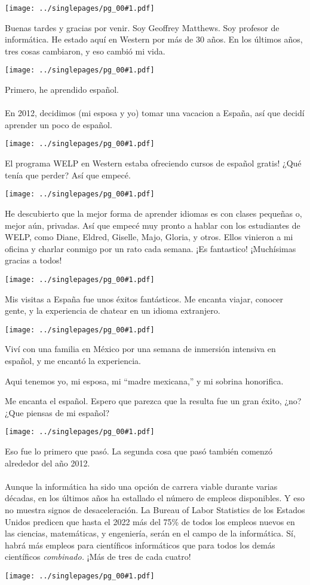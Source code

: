 \documentclass[12pt]{article}
\newcommand{\cue}{\mbox{}\\
  \fbox{\sf Next slide}
\\}
\newcommand{\fig}[1]{
  \newpage  
  \begin{center}
    \texttt{[image: ../singlepages/pg\_00\#1.pdf]}
  \end{center}
  
}
\begin{document}
\Large


\fig{01}
Buenas tardes y gracias por venir.  Soy Geoffrey Matthews. Soy
profesor de informática. He estado aquí en Western por más de 30 años.
En los últimos años, tres cosas cambiaron, y eso cambió mi vida.

\fig{03}

Primero, he aprendido español.  \cue En 2012, decidimos (mi esposa y
yo) tomar una vacacion a España, así que decidí aprender un poco de
español.

\fig{04}

El programa WELP en Western estaba ofreciendo cursos de
español gratis!  ¿Qué tenía que perder?  Así que empecé.

\fig{05}

He descubierto que la mejor forma de aprender idiomas es con clases
pequeñas o, mejor aún, privadas.  Así que empecé muy pronto a hablar
con los estudiantes de WELP, como Diane, Eldred, Giselle, Majo,
Gloria, y otros.  Ellos vinieron a mi oficina y charlar conmigo por un
rato cada semana.  ¡Es fantastico! ¡Muchísimas gracias a todos!

\fig{06}

Mis visitas a España fue unos éxitos fantásticos.  Me encanta viajar,
conocer gente, y la experiencia de chatear en un idioma extranjero.

\fig{07}

Viví con una familia en México por una semana de inmersión intensiva
en español, y me encantó la experiencia.

Aqui tenemos yo, mi esposa, mi ``madre mexicana,'' y mi sobrina
honorifica.  

Me encanta el español.  Espero que parezca que la resulta fue un gran
éxito, ¿no?  ¿Que piensas de mi español?


\fig{09}

Eso fue lo primero que pasó.  La segunda cosa que pasó también comenzó
alrededor del año 2012.  \cue Aunque la informática ha sido una opción
de carrera viable durante varias décadas, en los últimos años ha
estallado el número de empleos disponibles.  Y eso no muestra signos
de desaceleración.  La Bureau of Labor Statistics de los Estados
Unidos predicen que hasta el 2022 más del 75\% de todos los empleos
nuevos en las ciencias, matemáticas, y engeniería, serán en el campo
de la informática.  Sí, habrá más empleos para científicos
informáticos que para todos los demás científicos {\em combinado.}
¡Más de tres de cada cuatro!

\fig{10}
\end{document}
